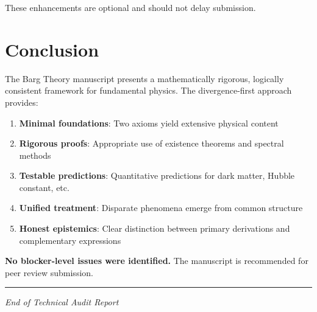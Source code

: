 \documentclass[11pt,a4paper]{article}
\newenvironment{auditstatus}[1]{%
    \begin{tcolorbox}[colback=green!5!white,colframe=green!75!black,title=#1]
}{\end{tcolorbox}}
\theoremstyle{definition}
\begin{document}
These enhancements are optional and should not delay submission.

\section{Conclusion}

\begin{auditstatus}{Final Assessment}
The Barg Theory manuscript presents a mathematically rigorous, logically consistent framework for fundamental physics. The divergence-first approach provides:

\begin{enumerate}
    \item \textbf{Minimal foundations}: Two axioms yield extensive physical content
    \item \textbf{Rigorous proofs}: Appropriate use of existence theorems and spectral methods
    \item \textbf{Testable predictions}: Quantitative predictions for dark matter, Hubble constant, etc.
    \item \textbf{Unified treatment}: Disparate phenomena emerge from common structure
    \item \textbf{Honest epistemics}: Clear distinction between primary derivations and complementary expressions
\end{enumerate}

\textbf{No blocker-level issues were identified.} The manuscript is recommended for peer review submission.
\end{auditstatus}

\vspace{2em}

\begin{center}
\rule{0.5\textwidth}{0.4pt}

\textit{End of Technical Audit Report}
\end{center}
\end{document}
